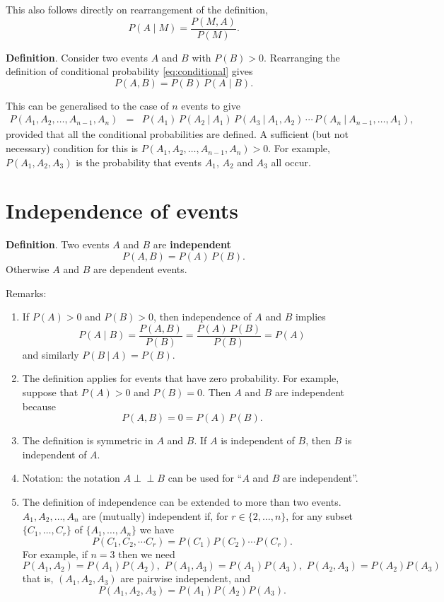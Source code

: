 \documentclass[
  11pt,
  british,
  openany, a4paper]{book}
\providecommand{\tightlist}{%
  \setlength{\itemsep}{0pt}\setlength{\parskip}{0pt}}
\begin{document}
This also follows directly on rearrangement of the definition,
\[ P(A \mid M) = \frac{P(M , A)}{P(M)}. \]

\textbf{Definition}. Consider two events \(A\) and \(B\) with \(P(B)>0\). Rearranging the definition of conditional probability \eqref{eq:conditional} gives
\begin{equation}
P(A , B) = P(B)\,P(A \mid B).  
\label{eq:mult}
\end{equation}

This can be generalised to the case of \(n\) events to give
\begin{eqnarray}
P(A_1, A_2,\ldots, A_{n-1}, A_n) &=&
P(A_1)\,P(A_2~|~A_1)\,P(A_3~|~A_1,A_2)\,\cdots\,P(A_n~|~A_{n-1},\ldots,A_1),
\end{eqnarray}
provided that all the conditional probabilities are defined. A sufficient (but not necessary) condition for this is \(P(A_1, A_2, \ldots, A_{n-1}, A_n)>0\). For example, \(P(A_1, A_2, A_3)\) is the probability that events \(A_1\), \(A_2\) and \(A_3\) all occur.

\hypertarget{indepevents}{%
\section{Independence of events}\label{indepevents}}

\textbf{Definition}. Two events \(A\) and \(B\) are \textbf{independent}
\begin{equation}
P(A , B) = P(A) \,P(B).  
\label{eq:indep}
\end{equation}
Otherwise \(A\) and \(B\) are dependent events.

Remarks:

\begin{enumerate}
\def\labelenumi{\arabic{enumi}.}
\tightlist
\item
  If \(P(A) > 0\) and \(P(B) > 0\), then independence of \(A\) and \(B\) implies
  \[ P(A \mid B) = \frac{P(A , B)}{P(B)} = \frac{P(A)\,P(B)}{P(B)} = P(A) \]
  and similarly \(P(B~|~A)=P(B)\).
\item
  The definition applies for events that have zero probability. For example, suppose that \(P(A)>0\) and \(P(B)=0\). Then \(A\) and \(B\) are independent because
  \[ P(A , B) = 0 = P(A)\,P(B). \]
\item
  The definition is symmetric in \(A\) and \(B\). If \(A\) is independent of \(B\), then \(B\) is independent of \(A\).
\item
  Notation: the notation \(A \perp \!\!\! \perp B\) can be used for ``\(A\) and \(B\) are independent''.
\item
  The definition of independence can be extended to more than two events.
  \(A_1, A_2, \ldots, A_n\) are (mutually) independent if, for \(r \in \{2, \ldots, n\}\), for any subset \(\{ C_1, \ldots, C_r \}\) of \(\{ A_1, \ldots, A_n\}\) we have
  \[ P(C_{1} , C_{2} , \cdots C_{r}) = P(C_{1}) P(C_{2}) \cdots P(C_{r}). \]
  For example, if \(n = 3\) then we need
  \[ P(A_{1} , A_{2}) = P(A_1) P(A_2), \,\, P(A_{1} , A_{3}) = P(A_1) P(A_3), \,\, P(A_{2} , A_{3}) = P(A_2) P(A_3) \]
  that is, \((A_1, A_2, A_3)\) are pairwise independent, and
  \[ P(A_{1} , A_{2} , A_{3}) = P(A_{1}) P(A_{2}) P(A_{3}). \]
\end{enumerate}
\end{document}
